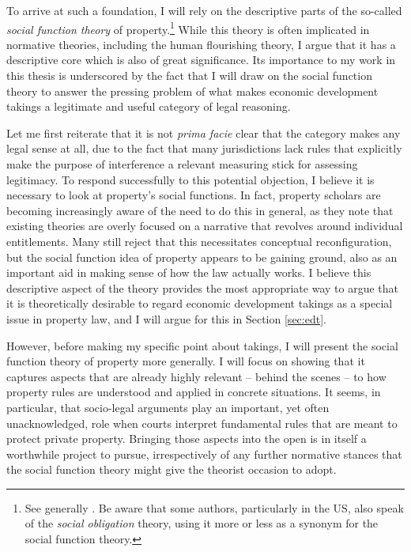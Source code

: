 \documentclass[12pt,a4paper]{book} %
\begin{document}
To arrive at such a foundation, I will rely on the descriptive parts of the so-called {\it social function theory} of property.\footnote{See generally \cite{foster11,mirow10,alexander09a}. Be aware that some authors, particularly in the US, also speak of the {\it social obligation} theory, using it more or less as a synonym for the social function theory.} While this theory is often implicated in normative theories, including the human flourishing theory, I argue that it has a descriptive core which is also of great significance. Its importance to my work in this thesis is underscored by the fact that I will draw on the social function theory to answer the pressing problem of what makes economic development takings a legitimate and useful category of legal reasoning. 

Let me first reiterate that it is not {\it prima facie} clear that the category makes any legal sense at all, due to the fact that many jurisdictions lack rules that explicitly make the purpose of interference a relevant measuring stick for assessing legitimacy. To respond successfully to this potential objection, I believe it is necessary to look at property's social functions. In fact, property scholars are becoming increasingly aware of the need to do this in general, as they note that existing theories are overly focused on a narrative that revolves around individual entitlements. Many still reject that this necessitates conceptual reconfiguration, but the social function idea of property appears to be gaining ground, also as an important aid in making sense of how the law actually works. I believe this descriptive aspect of the theory provides the most appropriate way to argue that it is theoretically desirable to regard economic development takings as a special issue in property law, and I will argue for this in Section \ref{sec:edt}.

However, before making my specific point about takings, I will present the social function theory of property more generally. I will focus on showing that it captures aspects that are already highly relevant -- behind the scenes -- to how property rules are understood and applied in concrete situations. It seems, in particular, that socio-legal arguments play an important, yet often unacknowledged, role when courts interpret fundamental rules that are meant to protect private property. Bringing those aspects into the open is in itself a worthwhile project to pursue, irrespectively of any further normative stances that the social function theory might give the theorist occasion to adopt.
\end{document}
